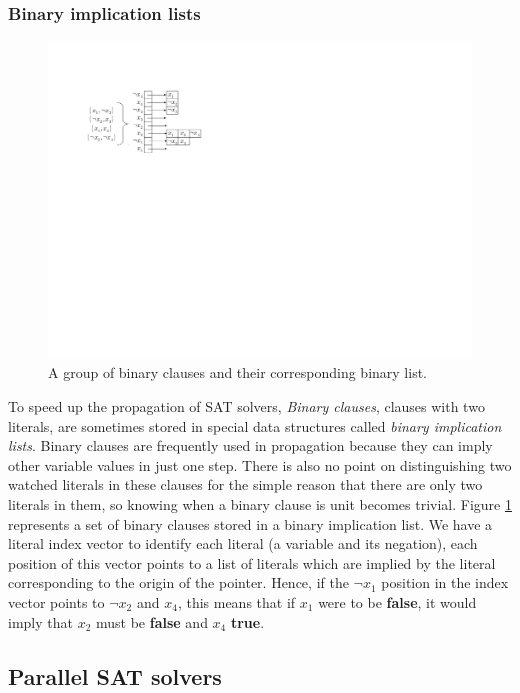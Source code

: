 \documentclass[12pt]{diicc}
\begin{document}
\subsubsection{Binary implication lists}

\begin{figure}[h!]
	\centering
		\includegraphics[scale=1]{binary_list}
	\caption{A group of binary clauses and their corresponding binary list.}
	\label{fig:binary list}
\end{figure}

To speed up the propagation of SAT solvers, \textit{Binary clauses}, clauses with two literals, are sometimes stored in special data structures called \textit{binary implication lists}. Binary clauses are frequently used in propagation because they can imply other variable values in just one step. There is also no point on distinguishing two watched literals in these clauses for the simple reason that there are only two literals in them, so knowing when a binary clause is unit becomes trivial. Figure \ref{fig:binary list} represents a set of binary clauses stored in a binary implication list. We have a literal index vector to identify each literal (a variable and its negation), each position of this vector points to a list of literals which are implied by the literal corresponding to the origin of the pointer. Hence, if the $\neg x_{1}$ position in the index vector points to $\neg x_{2}$ and $x_{4}$, this means that if $x_{1}$ were to be \textbf{false}, it would imply that $x_{2}$ must be \textbf{false} and $x_{4}$ \textbf{true}.

\subsection{Parallel SAT solvers}
\end{document}
